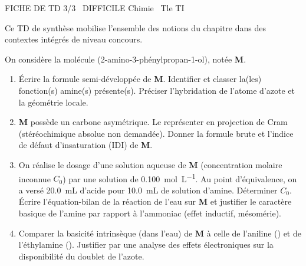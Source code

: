 \documentclass[11pt]{article}
\begin{document}
\begin{tcolorbox}[enhanced,colback=popink,colframe=popink,arc=10pt,boxrule=0pt,left=12pt,right=12pt,top=9pt,bottom=9pt]
{\color{white}\popxbold\small FICHE DE TD 3/3 \textbullet\ DIFFICILE \hfill Chimie \textbullet\ Tle TI\par}
\end{tcolorbox}
\vspace{4pt}
Ce TD de synthèse mobilise l'ensemble des notions du chapitre dans des contextes intégrés de niveau concours.

\begin{exercice}
On considère la molécule  (2-amino-3-phénylpropan-1-ol), notée \textbf{M}.
\begin{enumerate}
    \item Écrire la formule semi-développée de \textbf{M}. Identifier et classer la(les) fonction(s) amine(s) présente(s). Préciser l'hybridation de l'atome d'azote et la géométrie locale.
    \item \textbf{M} possède un carbone asymétrique. Le représenter en projection de Cram (stéréochimique absolue non demandée). Donner la formule brute et l'indice de défaut d'insaturation (IDI) de \textbf{M}.
    \item On réalise le dosage d'une solution aqueuse de \textbf{M} (concentration molaire inconnue $C_0$) par une solution de  \SI{0,100}{mol.L^{-1}}. Au point d'équivalence, on a versé \SI{20,0}{mL} d'acide pour \SI{10,0}{mL} de solution d'amine. Déterminer $C_0$. Écrire l'équation-bilan de la réaction de l'eau sur \textbf{M} et justifier le caractère basique de l'amine par rapport à l'ammoniac (effet inductif, mésomérie).
    \item Comparer la basicité intrinsèque (dans l'eau) de \textbf{M} à celle de l'aniline () et de l'éthylamine (). Justifier par une analyse des effets électroniques sur la disponibilité du doublet de l'azote.
\end{enumerate}
\end{exercice}
\end{document}

